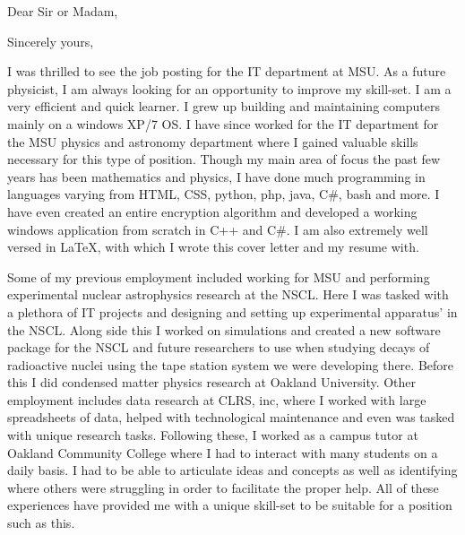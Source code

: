 \documentclass[11pt,a4paper,sans]{moderncv} %
\begin{document}
\makecvtitle 



\date{\today} %
\opening{Dear Sir or Madam,} %

\closing{Sincerely yours,} %

\makelettertitle %

\hspace{1cm} I was thrilled to see the job posting for the IT department at MSU. As a future physicist, I am always looking for an opportunity to improve my skill-set. I am a very efficient and quick learner. I grew up building and maintaining computers mainly on a windows XP/7 OS. I have since worked for the IT department for the MSU physics and astronomy department where I gained valuable skills necessary for this type of position. Though my main area of focus the past few years has been mathematics and physics, I have done much programming in languages varying from HTML, CSS, python, php, java, C\#, bash and more. I have even created an entire encryption algorithm and developed a working windows application from scratch in C++ and C\#. I am also extremely well versed in \LaTeX, with which I wrote this cover letter and my resume with.

\hspace{1cm} Some of my previous employment included working for MSU and performing experimental nuclear astrophysics research at the NSCL. Here I was tasked with a plethora of IT projects and designing and setting up experimental apparatus' in the NSCL. Along side this I worked on simulations and created a new software package for the NSCL and future researchers to use when studying decays of radioactive nuclei using the tape station system we were developing there. Before this I did condensed matter physics research at Oakland University. Other employment includes data research at CLRS, inc, where I worked with large spreadsheets of data, helped with technological maintenance and even was tasked with unique research tasks. Following these, I worked as a campus tutor at Oakland Community College where I had to interact with many students on a daily basis. I had to be able to articulate ideas and concepts as well as identifying where others were struggling in order to facilitate the proper help. All of these experiences have provided me with a unique skill-set to be suitable for a position such as this.
\end{document}

